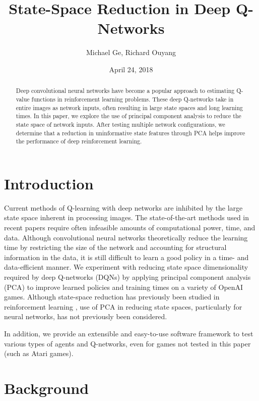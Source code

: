 \documentclass[11pt]{article}
\title{State-Space Reduction in Deep Q-Networks}
\author{Michael Ge, Richard Ouyang}
\date{April 24, 2018}
\begin{document}
\maketitle

\begin{abstract}
    Deep convolutional neural networks have become a popular approach to estimating Q-value functions in reinforcement learning problems. These deep Q-networks take in entire images as network inputs, often resulting in large state spaces and long learning times. In this paper, we explore the use of principal component analysis to reduce the state space of network inputs. After testing multiple network configurations, we determine that a reduction in uninformative state features through PCA helps improve the performance of deep reinforcement learning.
\end{abstract}

\newpage
\tableofcontents

\newpage

\section{Introduction}

Current methods of Q-learning with deep networks are inhibited by the
large state space inherent in processing images. The state-of-the-art
methods used in recent papers \cite{mnih2013playing, mnih2015human, van2016deep} require often infeasible
amounts of computational power, time, and data. Although convolutional
neural networks theoretically reduce the learning time by restricting
the size of the network and accounting for structural information in
the data, it is still difficult to learn a good policy in a time- and
data-efficient manner. We experiment with reducing state space
dimensionality required by deep Q-networks (DQNs) by applying
principal component analysis (PCA) to improve learned policies and
training times on a variety of OpenAI games. Although state-space reduction has previously been studied in reinforcement learning \cite{kishima2013reduction}, use of PCA in reducing state spaces, particularly for neural networks, has not previously been considered.

In addition, we provide an extensible and easy-to-use software
framework to test various types of agents and Q-networks, even for
games not tested in this paper (such as Atari games).

\section{Background}
\end{document}
